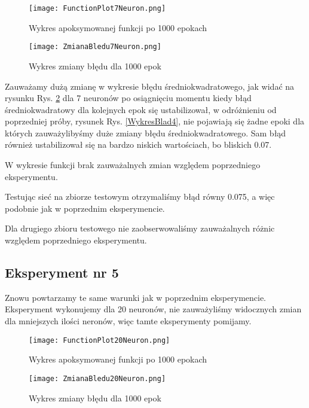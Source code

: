 \documentclass[12pt]{article}
\begin{document}
\begin{figure}[!htb]
 \centering
 \texttt{[image: FunctionPlot7Neuron.png]}
 \caption{Wykres apoksymowanej funkcji po 1000 epokach}
 \vspace{-0.3cm}
 \label{WykresFun6}
\end{figure}



\begin{figure}[!htb]
 \centering
 \texttt{[image: ZmianaBledu7Neuron.png]}
 \vspace{-0.3cm}
 \caption{Wykres zmiany błędu dla 1000 epok}
 \label{WykresBlad6}
\end{figure}

\newpage

Zauważamy dużą zmianę w wykresie błędu średniokwadratowego, jak widać na rysunku Rys. \ref{WykresBlad6} dla 7 neuronów po osiągnięciu momentu kiedy błąd średniokwadratowy dla kolejnych epok się ustabilizował, w odróżnieniu od poprzedniej próby, rysunek Rys. \ref{WykresBlad4}, nie pojawiają się żadne epoki dla których zauważylibyśmy duże zmiany błędu średniokwadratowego. Sam błąd również ustabilizował się na bardzo niskich wartościach, bo bliskich 0.07. 

W wykresie funkcji brak zauważalnych zmian względem poprzedniego eksperymentu.

Testując sieć na zbiorze testowym otrzymaliśmy błąd równy 0.075, a więc podobnie jak w poprzednim eksperymencie.

Dla drugiego zbioru testowego nie zaobserwowaliśmy zauważalnych różnic względem poprzedniego eksperymentu.

\newpage

\subsection{Eksperyment nr 5}
Znowu powtarzamy te same warunki jak w poprzednim eksperymencie.
Eksperyment wykonujemy dla 20 neuronów, nie zauważyliśmy widocznych zmian dla mniejszych ilości neronów, więc tamte eksperymenty pomijamy.


\begin{figure}[!htb]
 \centering
 \texttt{[image: FunctionPlot20Neuron.png]}
 \caption{Wykres apoksymowanej funkcji po 1000 epokach}
 \vspace{-0.3cm}
 \label{WykresFun7}
\end{figure}



\begin{figure}[!htb]
 \centering
 \texttt{[image: ZmianaBledu20Neuron.png]}
 \vspace{-0.3cm}
 \caption{Wykres zmiany błędu dla 1000 epok}
 \label{WykresBlad7}
\end{figure}
\end{document}
